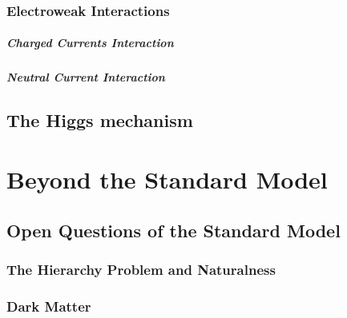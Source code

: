 \documentclass[10pt,twoside,cucitura,classica,english,openany]{toptesi}
\begin{document}


\subsection{Electroweak Interactions}
\label{sec:electro-weak-inter}



\paragraph{Charged Currents Interaction}
\label{sec:charg-curr-inter}



\paragraph{Neutral Current Interaction}
\label{sec:neutr-curr-inter}



\section{The Higgs mechanism}
\label{sec:higgs-mechanism}



\chapter{Beyond the Standard Model}
\label{cha:beyond-stand-model}

\section{Open Questions of the Standard Model}
\label{sec:open-quest-stand}



\subsection{The Hierarchy Problem and Naturalness}
\label{sec:hier-probl-natur}



\subsection{Dark Matter}
\label{sec:dark-matter}
\end{document}
